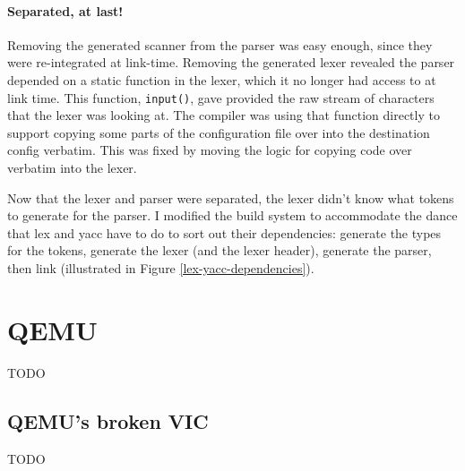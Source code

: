\documentclass[12pt]{article}
\newcommand{\TODO}[1]{{\huge\color{red}TODO \Large #1}}
\newcommand{\code}[1]{{\tt #1}}
\begin{document}
\paragraph{Separated, at last!}
Removing the generated scanner from the parser was easy enough, since they were
re-integrated at link-time. Removing the generated lexer revealed the 
parser depended on a static function in the lexer, which it no longer had
access to at link time. This function, \code{input()}, gave provided the raw
stream of characters that the lexer was looking at. The compiler was using that
function directly to support copying some parts of the configuration file over
into the destination config verbatim. This was fixed by moving the logic for
copying code over verbatim into the lexer.

Now that the lexer and parser were separated, the lexer didn't know what tokens
to generate for the parser. I modified the build system to accommodate the dance
that lex and yacc have to do to sort out their dependencies: generate the types
for the tokens, generate the lexer (and the lexer header), generate the parser,
then link (illustrated in Figure \ref{lex-yacc-dependencies}).

\section{QEMU}

\TODO{}

\subsection{QEMU's broken VIC}

\TODO{}
\end{document}
